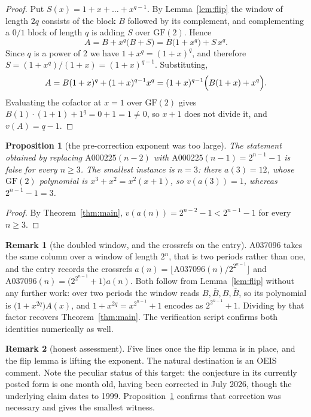 \documentclass[11pt,a4paper]{article}
\theoremstyle{plain}
\newtheorem{proposition}[theorem]{Proposition}
\theoremstyle{definition}
\newtheorem*{remark}{Remark}
\begin{document}
\begin{proof}
Put $S(x)=1+x+\dots+x^{q-1}$. By Lemma~\ref{lem:flip} the window of length $2q$ consists of
the block $B$ followed by its complement, and complementing a $0/1$ block of length $q$ is
adding $S$ over $\mathrm{GF}(2)$. Hence
\[
  A=B+x^{q}\bigl(B+S\bigr)=B\bigl(1+x^{q}\bigr)+S\,x^{q}.
\]
Since $q$ is a power of 2 we have $1+x^{q}=(1+x)^{q}$, and therefore
$S=(1+x^{q})/(1+x)=(1+x)^{q-1}$. Substituting,
\[
  A=B(1+x)^{q}+(1+x)^{q-1}x^{q}=(1+x)^{q-1}\Bigl(B(1+x)+x^{q}\Bigr).
\]
Evaluating the cofactor at $x=1$ over $\mathrm{GF}(2)$ gives $B(1)\cdot(1+1)+1^{q}=0+1=1
\ne0$, so $x+1$ does not divide it, and $v(A)=q-1$.
\end{proof}

\begin{proposition}[the pre-correction exponent was too large]\label{prop:old}
The statement obtained by replacing $\mathrm{A000225}(n-2)$ with
$\mathrm{A000225}(n-1)=2^{n-1}-1$ is false for every $n\ge3$. The smallest instance is
$n=3$: there $a(3)=12$, whose $\mathrm{GF}(2)$ polynomial is $x^{3}+x^{2}=x^{2}(x+1)$, so
$v(a(3))=1$, whereas $2^{n-1}-1=3$.
\end{proposition}

\begin{proof}
By Theorem~\ref{thm:main}, $v(a(n))=2^{n-2}-1<2^{n-1}-1$ for every $n\ge3$.
\end{proof}

\begin{remark}[the doubled window, and the crossrefs on the entry]
A037096 takes the same column over a window of length $2^{n}$, that is two periods rather
than one, and the entry records the crossrefs $a(n)=\lfloor
\mathrm{A037096}(n)/2^{2^{n-1}}\rfloor$ and $\mathrm{A037096}(n)=\bigl(2^{2^{n-1}}+1\bigr)
a(n)$. Both follow from Lemma~\ref{lem:flip} without any further work: over two periods the
window reads $B,\overline{B},B,\overline{B}$, so its polynomial is
$\bigl(1+x^{2q}\bigr)A(x)$, and $1+x^{2q}=x^{2^{n-1}}+1$ encodes as $2^{2^{n-1}}+1$.
Dividing by that factor recovers Theorem~\ref{thm:main}. The verification script confirms
both identities numerically as well.
\end{remark}

\begin{remark}[honest assessment]
Five lines once the flip lemma is in place, and the flip lemma is lifting the exponent. The
natural destination is an OEIS comment. Note the peculiar status of this target: the
conjecture in its currently posted form is one month old, having been corrected in July
2026, though the underlying claim dates to 1999. Proposition~\ref{prop:old} confirms that
correction was necessary and gives the smallest witness.
\end{remark}
\end{document}
